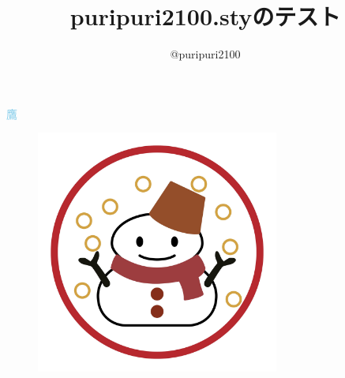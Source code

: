 \documentclass{jsarticle}
\begin{document}
\title{\textsf{puripuri2100.sty}のテスト}
\author{@puripuri2100}
\date{\puritoday}
\maketitle

\textcolor{SkyBlue}{鷹}
\begin{figure}[h]
\centering
\includegraphics[width=80mm]{aki.jpg}
\end{figure}
\end{document}
